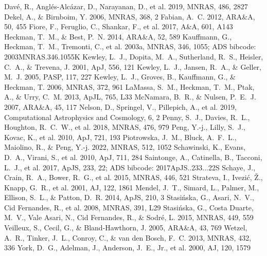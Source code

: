 \documentclass[twocolumn]{aastex631}
\begin{document}
\begin{thebibliography}{}
 Dav{\'e}, R., Angl{\'e}s-Alc{\'a}zar, D., Narayanan, D., et al. 2019, MNRAS, 486, 2827
 Dekel, A., \& Birnboim, Y. 2006, MNRAS, 368, 2
 Fabian, A.~C. 2012, ARA\&A, 50, 455
 Fiore, F., Feruglio, C., Shankar, F., et al. 2017, A\&A, 601, A143
 Heckman, T.~M., \& Best, P.~N. 2014, ARA\&A, 52, 589
 Kauffmann, G., Heckman, T.~M., Tremonti, C., et al. 2003a, MNRAS, 346, 1055; ADS bibcode: 2003MNRAS.346.1055K
 Kewley, L.~J., Dopita, M.~A., Sutherland, R.~S., Heisler, C.~A., \& Trevena, J. 2001, ApJ, 556, 121
 Kewley, L.~J., Jansen, R.~A., \& Geller, M.~J. 2005, PASP, 117, 227
 Kewley, L.~J., Groves, B., Kauffmann, G., \& Heckman, T. 2006, MNRAS, 372, 961
 LaMassa, S.~M., Heckman, T.~M., Ptak, A., \& Urry, C.~M. 2013, ApJL, 765, L33
 McNamara, B.~R., \& Nulsen, P.~E.~J. 2007, ARA\&A, 45, 117
 Nelson, D., Springel, V., Pillepich, A., et al. 2019, Computational Astrophysics and Cosmology, 6, 2
 Penny, S.~J., Davies, R.~L., Houghton, R.~C.~W., et al. 2018, MNRAS, 476, 979
 Peng, Y.-j., Lilly, S.~J., Kovac, K., et al. 2010, ApJ, 721, 193
 Piotrowska, J.~M., Bluck, A.~F.~L., Maiolino, R., \& Peng, Y.-j. 2022, MNRAS, 512, 1052
 Schawinski, K., Evans, D.~A., Virani, S., et al. 2010, ApJ, 711, 284
 Saintonge, A., Catinella, B., Tacconi, L.~J., et al. 2017, ApJS, 233, 22; ADS bibcode: 2017ApJS..233...22S
 Schaye, J., Crain, R.~A., Bower, R.~G., et al. 2015, MNRAS, 446, 521
 Strateva, I., Ivezi{\'c}, {\v Z}., Knapp, G.~R., et al. 2001, AJ, 122, 1861
 Mendel, J.~T., Simard, L., Palmer, M., Ellison, S.~L., \& Patton, D.~R. 2014, ApJS, 210, 3
 Stasi{\'n}ska, G., Asari, N.~V., Cid Fernandes, R., et al. 2008, MNRAS, 391, L29
 Stasi{\'n}ska, G., Costa Duarte, M.~V., Vale Asari, N., Cid Fernandes, R., \& Sodr{\'e}, L. 2015, MNRAS, 449, 559
 Veilleux, S., Cecil, G., \& Bland-Hawthorn, J. 2005, ARA\&A, 43, 769
 Wetzel, A.~R., Tinker, J.~L., Conroy, C., \& van den Bosch, F.~C. 2013, MNRAS, 432, 336
 York, D.~G., Adelman, J., Anderson, J.~E., Jr., et al. 2000, AJ, 120, 1579
\end{thebibliography}
\end{document}
